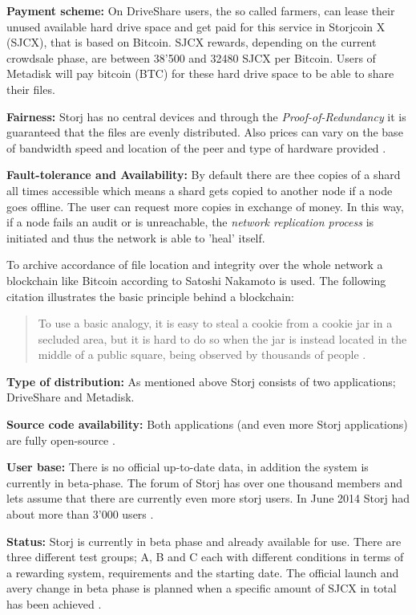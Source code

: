 \textbf{Payment scheme:} On DriveShare users, the so called farmers, can lease their unused available hard drive space and get paid for this service in Storjcoin X (SJCX), that is based on Bitcoin. SJCX rewards, depending on the current crowdsale phase, are between 38'500 and 32480 SJCX per Bitcoin\cite{storj:crowdsale}. Users of Metadisk will pay bitcoin (BTC) for these hard drive space to be able to share their files.

\textbf{Fairness:} Storj has no central devices and through the \textit{Proof-of-Redundancy} it is guaranteed that the files are evenly distributed. Also prices can vary on the base of bandwidth speed and location of the peer and type of hardware provided \cite{storj:PDF}.

\textbf{Fault-tolerance and Availability:} By default there are thee copies of a shard all times accessible which means a shard gets copied to another node if a node goes offline. The user can request more copies in exchange of money. In this way, if a node fails an audit or is unreachable, the \textit{network replication process} is initiated and thus the network is able to 'heal' itself.

To archive accordance of file location and integrity over the whole network a blockchain like Bitcoin according to Satoshi Nakamoto \cite{bitcoin} is used. The following citation illustrates the basic principle behind a blockchain:

\begin{quotation}
To use a basic analogy, it is easy to steal a cookie from a cookie jar in a secluded area, but it is hard to do so when the jar is instead located in the middle of a public square, being observed by thousands of people \cite{storj:PDF}.
\end{quotation}

\textbf{Type of distribution:} As mentioned above Storj consists of two applications; DriveShare and Metadisk.

\textbf{Source code availability:} Both applications (and even more Storj applications) are fully open-source \cite{storj:github}.

\textbf{User base:} There is no official up-to-date data, in addition the system is currently in beta-phase. The forum of Storj has over one thousand members \cite{storj:forum} and lets assume that there are currently even more storj users. In June 2014 Storj had about more than 3'000 users \cite{storj:crowdsale}.

\textbf{Status:} Storj is currently in beta phase and already available for use. There are three different test groups; A, B and C each with different conditions in terms of a rewarding system, requirements and the starting date. The official launch and avery change in beta phase is planned when a specific amount of SJCX in total has been achieved \cite {storj:earlyaccess}.


